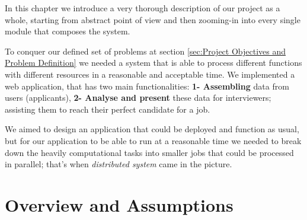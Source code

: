 

In this chapter we introduce a very thorough description of our project as a whole, starting from abstract point of view and then zooming-in into every single module that composes the system.


To conquer our defined set of problems at section \ref{sec:Project Objectives and Problem Definition} we needed a system that is able to process different functions with different resources in a reasonable and acceptable time. We implemented a web application, that has two main functionalities: \textbf{1- Assembling} data from users (applicants), \textbf{2- Analyse and present} these data for interviewers; assisting them to reach their perfect candidate for a job.


We aimed to design an application that could be deployed and function as usual, but for our application to be able to run at a reasonable time we needed to break down the heavily computational tasks into smaller jobs that could be processed in parallel; that's when \textit{distributed system} came in the picture.


\section{Overview and Assumptions}

